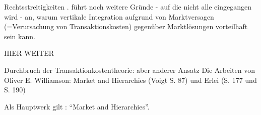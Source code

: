 Rechtsstreitigkeiten \parencite[S. 117]{Williamson1971}. \textcite{Williamson1971} führt noch weitere Gründe - auf die nicht alle eingegangen wird -  an, warum vertikale Integration aufgrund von Marktversagen (=Verursachung von Transaktionskosten) gegenüber Marktlösungen vorteilhaft sein kann.
 
 
 HIER WEITER 
 
 Durchbruch der Transaktionkostentheorie: aber anderer Ansatz
 Die Arbeiten von Oliver E. Williamson: Market and Hierarchies (Voigt S. 87) und Erlei (S. 177 und S. 190)
 
 
 \textcite{Williamson2009a}
 \textcite{Dreze1995}
 
 Als Hauptwerk gilt \textcite{Williamson1975}: "`Market and Hierarchies"'.
 
 
 
 
 
